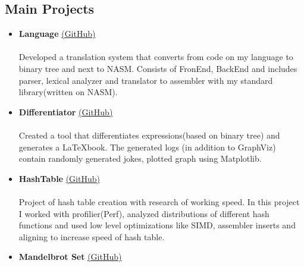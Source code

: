 \documentclass[margin,line]{resume}
\begin{document}
\begin{resume}
\section{\mysidestyle Main  Projects}
    \begin{itemize}
   		\item[\ding{114}] \textbf{\textsf{Language}} \href{https://github.com/khmelnitskiianton/Language}{(GitHub)} \vspace{2pt} \\
             \space {} \space {} \vspace{4pt} \\
            Developed a translation system that converts from code on my language to binary tree and next to NASM. Consists of FronEnd, BackEnd and includes parser, lexical analyzer and translator to assembler with my standard library(written on NASM).
            \item[\ding{114}] \textbf{\textsf{Differentiator}} \href{https://github.com/khmelnitskiianton/Differentiator}{(GitHub)} \vspace{2pt} \\
             \space {}  \space \mytcbox{\LaTeX} \vspace{4pt} \\
            Created a tool that differentiates expressions(based on binary tree) and generates a \LaTeX \space book. The generated logs (in addition to GraphViz) contain randomly generated jokes, plotted graph using Matplotlib.
            \item[\ding{114}] \textbf{\textsf{HashTable}} \href{https://github.com/khmelnitskiianton/HashTable}{(GitHub)} \vspace{2pt} \\
             \space {}  \space {} \vspace{4pt} \\
            Project of hash table creation with research of working speed. In this project I worked with profilier(Perf), analyzed distributions of different hash functions and used low level optimizations like SIMD, assembler inserts and aligning to increase speed of hash table.
            \item[\ding{114}] \textbf{\textsf{Mandelbrot Set}} \href{https://github.com/khmelnitskiianton/AsmCx86}{(GitHub)} \vspace{2pt} \\
             \space {} \space {} \vspace{4pt} \\

\end{itemize}
\end{resume}
\end{document}

